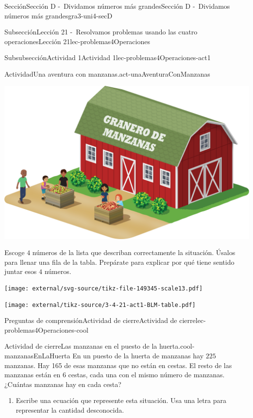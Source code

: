 \begin{sectionptx}{Sección}{Sección D -~Dividamos números más grandes}{}{Sección D -~Dividamos números más grandes}{}{}{gra3-uni4-secD}
\begin{subsectionptx}{Subsección}{Lección 21 -~Resolvamos problemas usando las cuatro operaciones}{}{Lección 21}{}{}{lec-problemas4Operaciones}
\begin{subsubsectionptx}{Subsubsección}{Actividad 1}{}{Actividad 1}{}{}{lec-problemas4Operaciones-act1}
\begin{activity}{Actividad}{Una aventura con manzanas.}{act-unaAventuraConManzanas}
\begin{sidebyside}{2}{0}{0}{0.1}
\begin{sbspanel}{0.3}
\includegraphics[max width=\linewidth, center]{external/png-source/3.4.D21.S_Sp.png}
\end{sbspanel}%
\end{sidebyside}%
\par
Escoge \(4\) números de la lista que describan correctamente la situación. Úsalos para llenar una fila de la tabla. Prepárate para explicar por qué tiene sentido juntar esos \(4\) números.%
\begin{image}{0}{1}{0}{}%
\texttt{[image: external/svg-source/tikz-file-149345-scale13.pdf]}
\end{image}%
\begin{image}{0}{1}{0}{}%
\texttt{[image: external/tikz-source/3-4-21-act1-BLM-table.pdf]}
\end{image}%
\end{activity}%
\end{subsubsectionptx}
%
%
\typeout{************************************************}
\typeout{************************************************}
%
\clearpage
\begin{reading-questions-subsubsection}{Preguntas de comprensión}{Actividad de cierre}{}{Actividad de cierre}{}{}{lec-problemas4Operaciones-cool}
\begin{project}{Actividad de cierre}{Las manzanas en el puesto de la huerta.}{cool-manzanasEnLaHuerta}%
En un puesto de la huerta de manzanas hay \(225\) manzanas. Hay 165 de esas manzanas que no están en cestas. El resto de las manzanas están en \(6\) cestas, cada una con el mismo número de manzanas. ¿Cuántas manzanas hay en cada cesta?%
%
\begin{enumerate}[label={(\alph*)}]
\item{}Escribe una ecuación que represente esta situación. Usa una letra para representar la cantidad desconocida.%

\end{enumerate}
\end{project}
\end{reading-questions-subsubsection}
\end{subsectionptx}
\end{sectionptx}
